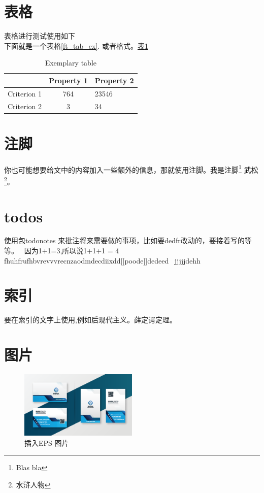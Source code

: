 \section{表格}
\blindtext %
表格进行测试使用如下 \\
下面就是一个表格\autoref{ft_tab_ex}. 或者格式。\hyperref[ft_tab_ex]{表\ref*{ft_tab_ex}}
\begin{table}[!h]
	\centering
	\begin{tabular}{l|c|l}
	\hline \hline
	
		& Property 1
		& Property 2\\ \hline
	Criterion 1
		& 764
		& 23546 \\
	Criterion 2
		& 3
		& 34 \\
	\hline \hline
	\end{tabular}
	\caption{Exemplary table}
	\label{ft_tab_ex}
\end{table}

\blindtext %




\section{注脚}
\blindtext %
你也可能想要给文中的内容加入一些额外的信息，那就使用注脚。我是注脚\footnote{Blas bla} 武松\footnote{水浒人物}。

\section{todos}
\blindtext %
使用包todonotes 来批注将来需要做的事项，比如要dedfr改动的，要接着写的等等。
\ 因为1+1=3,所以说1+1+1 = 4\\
fhuhfrufhbvrevvvrecnzaodmdecdiixdd[[poode]]dedeed \ jjjjjdehh 

\section{索引}
\blindtext %
要在索引的文字上使用,例如后现代主义。薛定谔定理。



\section{图片}
\begin{figure}[!h]
	\centering
	\includegraphics[width=0.5\textwidth]{figures/1.eps}
	\caption{插入EPS 图片}
\end{figure}

